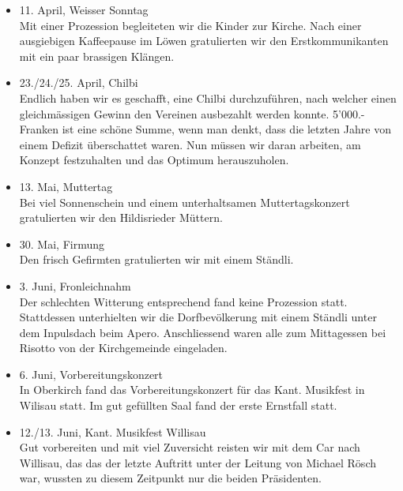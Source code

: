 \begin{history}
\begin{itemize}
        \item 11. April, Weisser Sonntag\\
              Mit einer Prozession begleiteten wir die Kinder zur Kirche. Nach einer
              ausgiebigen Kaffeepause im Löwen gratulierten wir den Erstkommunikanten mit
              ein paar brassigen Klängen.

        \item 23./24./25. April, Chilbi\\
              Endlich haben wir es geschafft, eine Chilbi durchzuführen, nach welcher
              einen gleichmässigen Gewinn den Vereinen ausbezahlt werden konnte.
              5'000.- Franken ist eine schöne Summe, wenn man denkt, dass die letzten
              Jahre von einem Defizit überschattet waren. Nun müssen wir daran
              arbeiten, am Konzept festzuhalten und das Optimum herauszuholen.

        \item 13. Mai, Muttertag\\
              Bei viel Sonnenschein und einem unterhaltsamen Muttertagskonzert
              gratulierten wir den Hildisrieder Müttern.

        \item 30. Mai, Firmung\\
              Den frisch Gefirmten gratulierten wir mit einem Ständli.

        \item 3. Juni, Fronleichnahm\\
              Der schlechten Witterung entsprechend fand keine Prozession statt.
              Stattdessen unterhielten wir die Dorfbevölkerung mit einem Ständli
              unter dem Inpulsdach beim Apero. Anschliessend waren alle zum
              Mittagessen bei Risotto von der Kirchgemeinde eingeladen.

        \item 6. Juni, Vorbereitungskonzert\\
              In Oberkirch fand das Vorbereitungskonzert für das Kant. Musikfest in
              Wilisau statt. Im gut gefüllten Saal fand der erste Ernstfall statt.

        \item 12./13. Juni, Kant. Musikfest Willisau\\
              Gut vorbereiten und mit viel Zuversicht reisten wir mit dem Car nach
              Willisau, das das der letzte Auftritt unter der Leitung von Michael
              Rösch war, wussten zu diesem Zeitpunkt nur die beiden Präsidenten.


\end{itemize}
\end{history}
